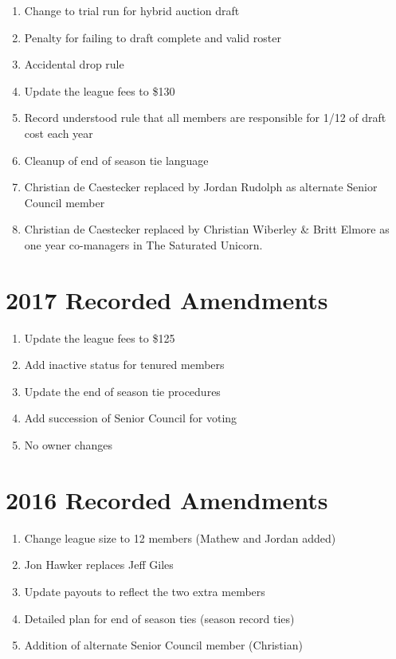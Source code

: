 \documentclass[
]{book}
\providecommand{\tightlist}{%
  \setlength{\itemsep}{0pt}\setlength{\parskip}{0pt}}
\begin{document}
\begin{enumerate}
\def\labelenumi{\arabic{enumi}.}
\tightlist
\item
  Change to trial run for hybrid auction draft
\item
  Penalty for failing to draft complete and valid roster
\item
  Accidental drop rule
\item
  Update the league fees to \$130
\item
  Record understood rule that all members are responsible for 1/12 of draft cost each year
\item
  Cleanup of end of season tie language
\item
  Christian de Caestecker replaced by Jordan Rudolph as alternate Senior Council member
\item
  Christian de Caestecker replaced by Christian Wiberley \& Britt Elmore as one year co-managers in The Saturated Unicorn.
\end{enumerate}

\hypertarget{recorded-amendments-4}{%
\section{2017 Recorded Amendments}\label{recorded-amendments-4}}

\begin{enumerate}
\def\labelenumi{\arabic{enumi}.}
\tightlist
\item
  Update the league fees to \$125
\item
  Add inactive status for tenured members
\item
  Update the end of season tie procedures
\item
  Add succession of Senior Council for voting
\item
  No owner changes
\end{enumerate}

\hypertarget{recorded-amendments-5}{%
\section{2016 Recorded Amendments}\label{recorded-amendments-5}}

\begin{enumerate}
\def\labelenumi{\arabic{enumi}.}
\tightlist
\item
  Change league size to 12 members (Mathew and Jordan added)
\item
  Jon Hawker replaces Jeff Giles
\item
  Update payouts to reflect the two extra members
\item
  Detailed plan for end of season ties (season record ties)
\item
  Addition of alternate Senior Council member (Christian)
\end{enumerate}
\end{document}
